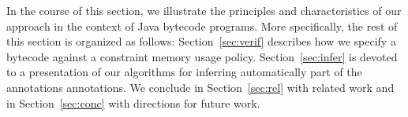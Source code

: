 In the course of this section, we illustrate the principles and
characteristics of our approach in the context of Java bytecode
programs. More specifically,  the rest of this section is organized
 as follows:
Section~\ref{sec:verif} describes how we specify a bytecode against
a constraint memory usage policy. 
Section~\ref{sec:infer} is devoted to a presentation of our
algorithms for inferring automatically part of the annotations annotations.
 We conclude in Section~\ref{sec:rel} with related work and in Section~\ref{sec:conc}
with directions for future work.


